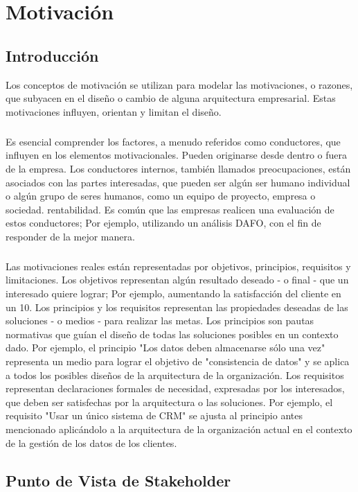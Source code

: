 \chapter{Motivación}
\section{Introducción}
Los conceptos de motivación se utilizan para modelar las motivaciones, o razones, que subyacen en el diseño o cambio de alguna arquitectura empresarial. Estas motivaciones influyen, orientan y limitan el diseño.
\paragraph{}
Es esencial comprender los factores, a menudo referidos como conductores, que influyen en los elementos motivacionales. Pueden originarse desde dentro o fuera de la empresa. Los conductores internos, también llamados preocupaciones, están asociados con las partes interesadas, que pueden ser algún ser humano individual o algún grupo de seres humanos, como un equipo de proyecto, empresa o sociedad. rentabilidad. Es común que las empresas realicen una evaluación de estos conductores; Por ejemplo, utilizando un análisis DAFO, con el fin de responder de la mejor manera.
\paragraph{}
Las motivaciones reales están representadas por objetivos, principios, requisitos y limitaciones. Los objetivos representan algún resultado deseado - o final - que un interesado quiere lograr; Por ejemplo, aumentando la satisfacción del cliente en un 10. Los principios y los requisitos representan las propiedades deseadas de las soluciones - o medios - para realizar las metas. Los principios son pautas normativas que guían el diseño de todas las soluciones posibles en un contexto dado. Por ejemplo, el principio "Los datos deben almacenarse sólo una vez" representa un medio para lograr el objetivo de "consistencia de datos" y se aplica a todos los posibles diseños de la arquitectura de la organización. Los requisitos representan declaraciones formales de necesidad, expresadas por los interesados, que deben ser satisfechas por la arquitectura o las soluciones. Por ejemplo, el requisito "Usar un único sistema de CRM" se ajusta al principio antes mencionado aplicándolo a la arquitectura de la organización actual en el contexto de la gestión de los datos de los clientes.
\newpage
\section{Punto de Vista de Stakeholder}

